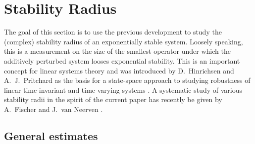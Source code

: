 \documentclass[10pt,psamsfonts,leqno]{siamltex}
\begin{document}
\section{Stability Radius}

The goal of this section is to use the previous development to study
the (complex)  stability radius of an exponentially stable system.
Loosely speaking, this is a measurement on the size of the smallest
operator under which the additively perturbed system looses exponential
stability.  This is an important concept for linear systems theory and
was introduced by D.~Hinrichsen and A.~J.~Pritchard  as the basis for a
state-space approach to studying robustness of linear time-invariant
\cite{HP86} and time-varying systems \cite{HIP89,HP94,PT89}. A
systematic study of various stability radii in the spirit of the
current paper has recently be given by
A.~Fischer and J.~van Neerven \cite{FishvN}.

\subsection{General estimates}
\end{document}
